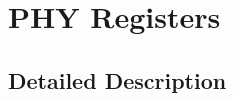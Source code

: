 \hypertarget{group__phy}{}\section{P\+HY Registers}
\label{group__phy}


\subsection{Detailed Description}
